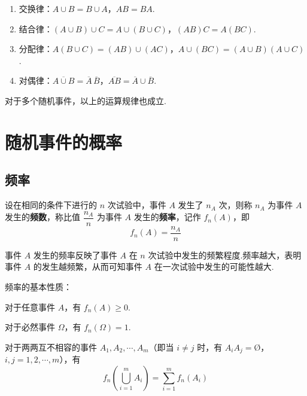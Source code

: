 \begin{enumerate}
    \item 交换律：$A \cup B = B \cup A$，$AB=BA$.
    \item 结合律：$(A \cup B) \cup C = A \cup (B \cup C)$，$(AB)C=A(BC)$.
    \item 分配律：$A(B \cup C)=(AB)\cup(AC)$，$A\cup(BC)=(A \cup B)(A \cup C)$.
    \item 对偶律：$\overline{A \cup B}=\overline{A}\,\overline{B}$，$\overline{AB}=\overline{A}\cup\overline{B}$.
\end{enumerate}

对于多个随机事件，以上的运算规律也成立.

\section{随机事件的概率}

\subsection{频率}

\begin{definition}
    设在相同的条件下进行的 $n$ 次试验中，事件 $A$ 发生了 $n_A$ 次，则称 $n_A$ 为事件 $A$ 发生的\textbf{频数}，称比值 $\dfrac{n_A}{n}$ 为事件 $A$ 发生的\textbf{频率}，记作 $f_n(A)$，即
    $$
    f_n(A)=\dfrac{n_A}{n}
    $$
\end{definition}

事件 $A$ 发生的频率反映了事件 $A$ 在 $n$ 次试验中发生的频繁程度.频率越大，表明事件 $A$ 的发生越频繁，从而可知事件 $A$ 在一次试验中发生的可能性越大.

频率的基本性质：

\setcounter{propertyname}{0}

\begin{property}[(非负性)]
    对于任意事件 $A$，有 $f_n(A) \geqslant 0$.
\end{property}

\begin{property}[(规范性)]
    对于必然事件 $\varOmega$，有 $f_n(\varOmega)=1$.
\end{property}

\begin{property}[(有限可加性)]
    对于两两互不相容的事件 $A_1,A_2,\cdots,A_m$（即当 $i\not=j$ 时，有 $A_i A_j = \text{\O}$，$i,j=1,2,\cdots,m$），有
    $$
    f_n(\bigcup_{i=1}^m A_i) = \sum_{i=1}^m f_n(A_i)
    $$
\end{property}

